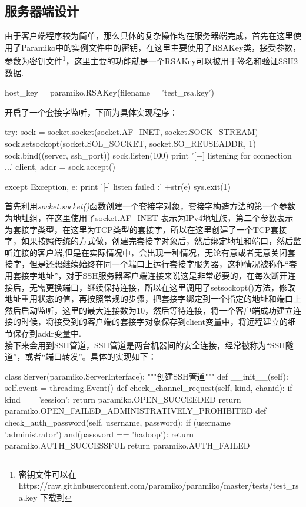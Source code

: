 \documentclass[UTF8,a4paper,cs4size]{ctexart}
\begin{document}
\subsection{服务器端设计}
由于客户端程序较为简单，那么具体的复杂操作均在服务器端完成，首先在这里使用了Paramiko中的实例文件中的密钥，在这里主要使用了RSAKey类，接受参数，参数为密钥文件\footnote{密钥文件可以在https://raw.githubusercontent.com/paramiko/paramiko/master/tests/test\_rsa.key 下载到}，这里主要的功能就是一个RSAKey可以被用于签名和验证SSH2数据.

\begin{python}
host_key = paramiko.RSAKey(filename = 'test_rsa.key')
\end{python}

\indent 开启了一个套接字监听，下面为具体实现程序：
\begin{python}
try:
	sock = socket.socket(socket.AF_INET, socket.SOCK_STREAM)
	sock.setsockopt(socket.SOL_SOCKET, socket.SO_REUSEADDR, 1)
	sock.bind((server, ssh_port))
	sock.listen(100)
	print '[+] listening for connection ...'
	client, addr = sock.accept()

except Exception, e:
	print '[-] listen failed :' +str(e)
	sys.exit(1)
\end{python}

\indent 首先利用\textit{socket.socket()}函数创建一个套接字对象，套接字构造方法的第一个参数为地址组，在这里使用了socket.AF\_INET 表示为IPv4地址族，第二个参数表示为套接字类型，在这里为TCP类型的套接字，所以在这里创建了一个TCP套接字，如果按照传统的方式做，创建完套接字对象后，然后绑定地址和端口，然后监听连接的客户端,但是在实际情况中，会出现一种情况，无论有意或者无意关闭套接字，但是还想继续始终在同一个端口上运行套接字服务器，这种情况被称作“套用套接字地址”，对于SSH服务器客户端连接来说这是非常必要的，在每次断开连接后，无需更换端口，继续保持连接，所以在这里调用了setsockopt()方法，修改地址重用状态的值，再按照常规的步骤，把套接字绑定到一个指定的地址和端口上然后启动监听，这里的最大连接数为10，然后等待连接，将一个客户端成功建立连接的时候，将接受到的客户端的套接字对象保存到client变量中，将远程建立的细节保存到addr变量中.\\
\indent 接下来会用到SSH管道，SSH管道是两台机器间的安全连接，经常被称为“SSH隧道”，或者“端口转发”。具体的实现如下：
\begin{python}
class Server(paramiko.ServerInterface):
	"""创建SSH管道"""
	def __init__(self):
		self.event = threading.Event()		
	def check_channel_request(self, kind, chanid):
		if kind == 'session':
			return paramiko.OPEN_SUCCEEDED
		return paramiko.OPEN_FAILED_ADMINISTRATIVELY_PROHIBITED
	def check_auth_password(self, username, password):
		if (username == 'administrator') and(password == 'hadoop'):
			return paramiko.AUTH_SUCCESSFUL
		return paramiko.AUTH_FAILED
\end{python}
\end{document}
